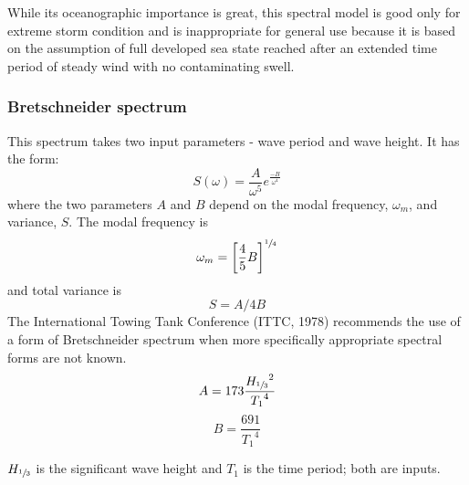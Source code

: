 While its oceanographic importance is great, this spectral model is good only
for extreme storm condition and is inappropriate for general use because it is
based on the assumption of full developed sea state reached after an extended
time period of steady wind with no contaminating swell. 

\subsubsection{Bretschneider spectrum} \label{Bretschneider spectrum}
This spectrum takes two input parameters - wave period and wave height. It has
the form:
\begin{equation}
  S(\omega) = \frac{A}{\omega^5} e^{\frac{-B}{\omega^4}}
  \label {eq: bretschneider spectrum}
\end{equation}
where the two parameters $A$ and $B$ depend on the modal frequency, $\omega_m$,
and variance, $S$. The modal frequency is
\begin{equation}
  \omega_m = \bigg[\frac{4}{5}B \bigg]^{\sfrac{1}{4}}
\end{equation}
and total variance is 
\begin{equation}
  S = A/4B
\end{equation}
The International Towing Tank Conference (ITTC, 1978) recommends the use of a
form of Bretschneider spectrum when more specifically appropriate spectral forms
are not known. 
\begin{equation}
  A = 173 \frac{{H_{\sfrac{1}{3}}}^2 }{{T_1}^4}
\end{equation}
\begin{equation}
  B = \frac{691}{{T_1}^4} 
\end{equation}

$H_{\sfrac{1}{3}}$ is the significant wave height and $T_1$ is the time period;
both are inputs.

